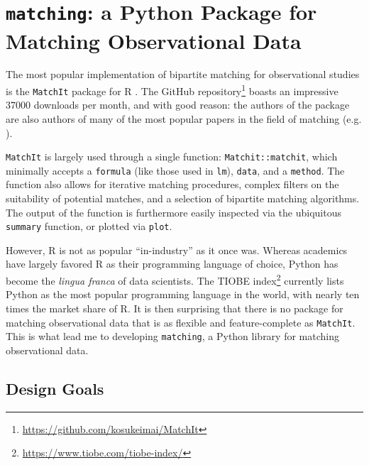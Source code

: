 \documentclass[11pt]{extarticle}
\begin{document}
\section{\texttt{matching}: a Python Package for Matching Observational Data}

The most popular implementation of bipartite matching for observational studies is the \texttt{MatchIt} package for R \parencite{ho_matchit_2011}.
The GitHub repository\footnote{\url{https://github.com/kosukeimai/MatchIt}} boasts an impressive $37000$ downloads per month, and with good reason: the authors of the package are also authors of many of the most popular papers in the field of matching (e.g. \textcite{ho_matching_2007, imai_causal_2004, king_why_2019, stuart_matching_2010}).

\texttt{MatchIt} is largely used through a single function: \texttt{Matchit::matchit}, which minimally accepts a \texttt{formula} (like those used in \texttt{lm}), \texttt{data}, and a \texttt{method}. The function also allows for iterative matching procedures, complex filters on the suitability of potential matches, and a selection of bipartite matching algorithms. The output of the function is furthermore easily inspected via the ubiquitous \texttt{summary} function, or plotted via \texttt{plot}.

However, R is not as popular ``in-industry'' as it once was. Whereas academics have largely favored R as their programming language of choice, Python has become the \emph{lingua franca} of data scientists. The TIOBE index\footnote{\url{https://www.tiobe.com/tiobe-index/}} currently lists Python as the most popular programming language in the world, with nearly ten times the market share of R.
It is then surprising that there is no package for matching observational data that is as flexible and feature-complete as \texttt{MatchIt}. This is what lead me to developing \texttt{matching}, a Python library for matching observational data.

\subsection{Design Goals}
\end{document}
